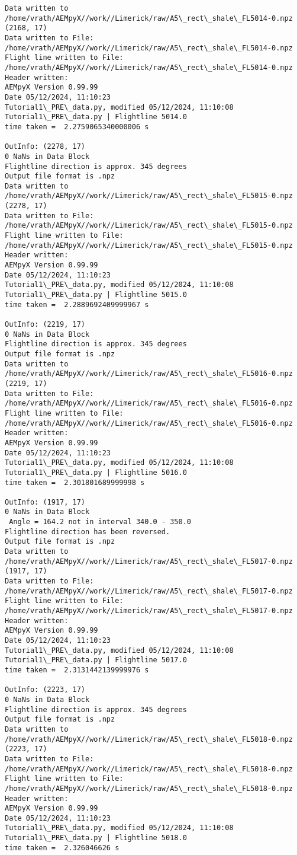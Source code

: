 \documentclass[11pt]{article}
\begin{document}
    \begin{Verbatim}[commandchars=\\\{\}]
Data written to
/home/vrath/AEMpyX//work//Limerick/raw/A5\_rect\_shale\_FL5014-0.npz
(2168, 17)
Data written to File:
/home/vrath/AEMpyX//work//Limerick/raw/A5\_rect\_shale\_FL5014-0.npz
Flight line written to File:
/home/vrath/AEMpyX//work//Limerick/raw/A5\_rect\_shale\_FL5014-0.npz
Header written:
AEMpyX Version 0.99.99
Date 05/12/2024, 11:10:23
Tutorial1\_PRE\_data.py, modified 05/12/2024, 11:10:08
Tutorial1\_PRE\_data.py | Flightline 5014.0
time taken =  2.2759065340000006 s

OutInfo: (2278, 17)
0 NaNs in Data Block
Flightline direction is approx. 345 degrees
Output file format is .npz
Data written to
/home/vrath/AEMpyX//work//Limerick/raw/A5\_rect\_shale\_FL5015-0.npz
(2278, 17)
Data written to File:
/home/vrath/AEMpyX//work//Limerick/raw/A5\_rect\_shale\_FL5015-0.npz
Flight line written to File:
/home/vrath/AEMpyX//work//Limerick/raw/A5\_rect\_shale\_FL5015-0.npz
Header written:
AEMpyX Version 0.99.99
Date 05/12/2024, 11:10:23
Tutorial1\_PRE\_data.py, modified 05/12/2024, 11:10:08
Tutorial1\_PRE\_data.py | Flightline 5015.0
time taken =  2.2889692409999967 s

OutInfo: (2219, 17)
0 NaNs in Data Block
Flightline direction is approx. 345 degrees
Output file format is .npz
Data written to
/home/vrath/AEMpyX//work//Limerick/raw/A5\_rect\_shale\_FL5016-0.npz
(2219, 17)
Data written to File:
/home/vrath/AEMpyX//work//Limerick/raw/A5\_rect\_shale\_FL5016-0.npz
Flight line written to File:
/home/vrath/AEMpyX//work//Limerick/raw/A5\_rect\_shale\_FL5016-0.npz
Header written:
AEMpyX Version 0.99.99
Date 05/12/2024, 11:10:23
Tutorial1\_PRE\_data.py, modified 05/12/2024, 11:10:08
Tutorial1\_PRE\_data.py | Flightline 5016.0
time taken =  2.301801689999998 s

OutInfo: (1917, 17)
0 NaNs in Data Block
 Angle = 164.2 not in interval 340.0 - 350.0
Flightline direction has been reversed.
Output file format is .npz
Data written to
/home/vrath/AEMpyX//work//Limerick/raw/A5\_rect\_shale\_FL5017-0.npz
(1917, 17)
Data written to File:
/home/vrath/AEMpyX//work//Limerick/raw/A5\_rect\_shale\_FL5017-0.npz
Flight line written to File:
/home/vrath/AEMpyX//work//Limerick/raw/A5\_rect\_shale\_FL5017-0.npz
Header written:
AEMpyX Version 0.99.99
Date 05/12/2024, 11:10:23
Tutorial1\_PRE\_data.py, modified 05/12/2024, 11:10:08
Tutorial1\_PRE\_data.py | Flightline 5017.0
time taken =  2.3131442139999976 s

OutInfo: (2223, 17)
0 NaNs in Data Block
Flightline direction is approx. 345 degrees
Output file format is .npz
Data written to
/home/vrath/AEMpyX//work//Limerick/raw/A5\_rect\_shale\_FL5018-0.npz
(2223, 17)
Data written to File:
/home/vrath/AEMpyX//work//Limerick/raw/A5\_rect\_shale\_FL5018-0.npz
Flight line written to File:
/home/vrath/AEMpyX//work//Limerick/raw/A5\_rect\_shale\_FL5018-0.npz
Header written:
AEMpyX Version 0.99.99
Date 05/12/2024, 11:10:23
Tutorial1\_PRE\_data.py, modified 05/12/2024, 11:10:08
Tutorial1\_PRE\_data.py | Flightline 5018.0
time taken =  2.326046626 s


\end{Verbatim}
\end{document}
